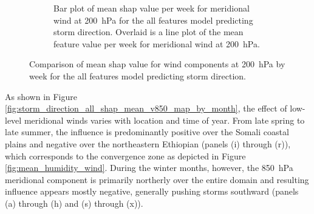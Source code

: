 \begin{figure}[ht]
\begin{subfigure}[t]{\textwidth}
        \caption{Bar plot of mean \acrshort{shap} value per week for meridional wind at \SI{200}{\hecto\pascal} for the all features model predicting storm direction. Overlaid is a line plot of the mean feature value per week for meridional wind at \SI{200}{\hecto\pascal}.}
        \label{fig:storm_direction_all_shap_mean_v200_by_week_over_year}
    \end{subfigure}
    \caption{Comparison of mean \acrshort{shap} value for wind components at \SI{200}{\hecto\pascal} by week for the all features model predicting storm direction.}
    \label{fig:storm_direction_wind_200_by_week_over_year}
\end{figure}

As shown in Figure \ref{fig:storm_direction_all_shap_mean_v850_map_by_month}, the effect of low-level meridional winds varies with location and time of year. From late spring to late summer, the influence is predominantly positive over the Somali coastal plains and negative over the northeastern Ethiopian (panels (i) through (r)), which corresponds to the convergence zone as depicted in Figure \ref{fig:mean_humidity_wind}. During the winter months, however, the \SI{850}{\hecto\pascal} meridional component is primarily northerly over the entire domain and resulting influence appears mostly negative, generally pushing storms southward (panels (a) through (h) and (s) through (x)).

